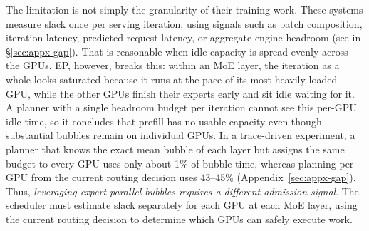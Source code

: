 The limitation is not simply the granularity of their training work.
These systems measure slack once per serving iteration, using signals such as batch composition, iteration latency, predicted request latency, or aggregate engine headroom (see  in \S\ref{sec:appx-gap}).
That is reasonable when idle capacity is spread evenly across the GPUs.
\ac{EP}, however, breaks this: within an \ac{MoE} layer, the iteration as a whole looks saturated because it runs at the pace of its most heavily loaded GPU, while the other GPUs finish their experts early and sit idle waiting for it. 
A planner with a single headroom budget per iteration cannot see this per-GPU idle time, so it concludes that prefill has no usable capacity even though substantial bubbles remain on individual GPUs. In a trace-driven experiment, a planner that knows the exact mean bubble of each layer but assigns the same budget to every GPU uses only about 1\% of bubble time, whereas planning per GPU from the current routing decision uses 43--45\% (Appendix~\ref{sec:appx-gap}).
Thus, \emph{leveraging expert-parallel bubbles requires a different admission signal}.
The scheduler must estimate slack separately for each GPU at each \ac{MoE} layer, using the current routing decision to determine which GPUs can safely execute work.


